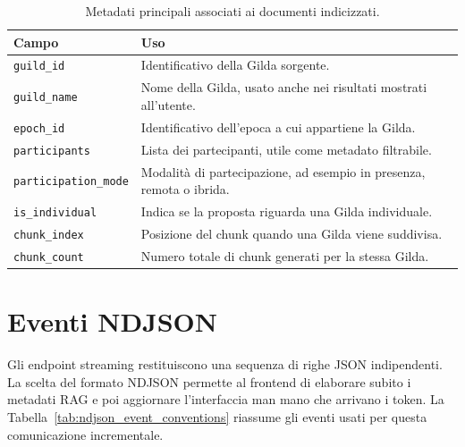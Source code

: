 \begin{table}[ht]
  \centering
  \caption{Metadati principali associati ai documenti indicizzati.}
  \label{tab:document_metadata_conventions}
  \small
  \begin{tabularx}{\textwidth}{L{4cm}Y}
    \toprule
    \textbf{Campo} & \textbf{Uso} \\
    \midrule
    \texttt{guild\_id}
      & Identificativo della Gilda sorgente. \\
    \texttt{guild\_name}
      & Nome della Gilda, usato anche nei risultati mostrati all'utente. \\
    \texttt{epoch\_id}
      & Identificativo dell'epoca a cui appartiene la Gilda. \\
    \texttt{participants}
      & Lista dei partecipanti, utile come metadato filtrabile. \\
    \texttt{participation\_mode}
      & Modalità di partecipazione, ad esempio in presenza, remota o ibrida. \\
    \texttt{is\_individual}
      & Indica se la proposta riguarda una Gilda individuale. \\
    \texttt{chunk\_index}
      & Posizione del chunk quando una Gilda viene suddivisa. \\
    \texttt{chunk\_count}
      & Numero totale di chunk generati per la stessa Gilda. \\
    \bottomrule
  \end{tabularx}
\end{table}

\section{Eventi NDJSON}

Gli endpoint streaming restituiscono una sequenza di righe JSON indipendenti.
La scelta del formato NDJSON permette al frontend di elaborare subito i metadati
RAG e poi aggiornare l'interfaccia man mano che arrivano i token.
La Tabella~\ref{tab:ndjson_event_conventions} riassume gli eventi usati per
questa comunicazione incrementale.

